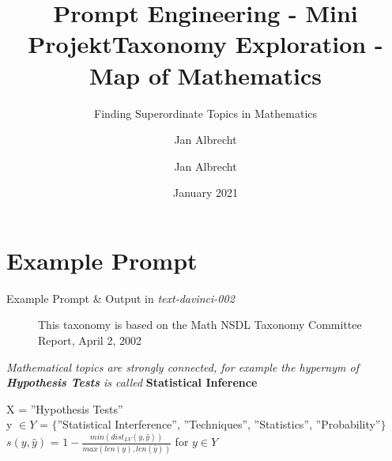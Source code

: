 \documentclass{beamer}
\title{Prompt Engineering - Mini Projekt}
\author{Jan Albrecht}
\date{January 2021}
\title[Prompt Engineering Project] %
{Taxonomy Exploration - Map of Mathematics}
\subtitle{Finding Superordinate Topics in Mathematics}
\author[J. Albrecht] %
{Jan Albrecht}
\institute[Student - University Leipzig] %
{University Leipzig}
\date[12.06.2022] %
\begin{document}
	\frame{\titlepage}
	\section{Example Prompt}
	\begin{frame}{Example Prompt \& Output in \textit{text-davinci-002}}
		\begin{figure}
			\captionsetup[wrapfigure]{font=small}
			\caption{This taxonomy is based on the Math NSDL Taxonomy Committee Report, April 2, 2002}
			\label{fig:tax}
		\end{figure}

		\textit{Mathematical topics are strongly connected, for example the hypernym of \textbf{Hypothesis Tests} is called} \color{forestgreen} \textbf{Statistical Inference}\\[30pt] \color{black}
	
		X = ''Hypothesis Tests''\\[6pt]
		y $\in Y$ = $\{$''Statistical Interference'', ''Techniques'', ''Statistics'', ''Probability''$\}$\\[6pt]
		$s(y,\hat{y})$ = $1 - \frac{min(dist_{LV}(y, \hat{y}))}{max(len(y),len(\hat{y}))}$ for $y \in Y$\\[48pt]
	\end{frame}
\end{document}
